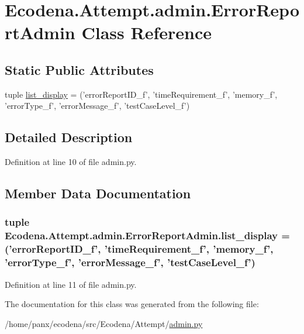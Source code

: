 \hypertarget{class_ecodena_1_1_attempt_1_1admin_1_1_error_report_admin}{
\section{Ecodena.Attempt.admin.ErrorReportAdmin Class Reference}
\label{d6/dbe/class_ecodena_1_1_attempt_1_1admin_1_1_error_report_admin}
}
\subsection*{Static Public Attributes}
\begin{DoxyCompactItemize}
\item 
tuple \hyperlink{class_ecodena_1_1_attempt_1_1admin_1_1_error_report_admin_a36d000c316cf4d6c0373922e9bda557d}{list\_\-display} = ('errorReportID\_\-f', 'timeRequirement\_\-f', 'memory\_\-f', 'errorType\_\-f', 'errorMessage\_\-f', 'testCaseLevel\_\-f')
\end{DoxyCompactItemize}


\subsection{Detailed Description}


Definition at line 10 of file admin.py.



\subsection{Member Data Documentation}
\hypertarget{class_ecodena_1_1_attempt_1_1admin_1_1_error_report_admin_a36d000c316cf4d6c0373922e9bda557d}{
\subsubsection[{list\_\-display}]{\setlength{\rightskip}{0pt plus 5cm}tuple {\bf Ecodena.Attempt.admin.ErrorReportAdmin.list\_\-display} = ('errorReportID\_\-f', 'timeRequirement\_\-f', 'memory\_\-f', 'errorType\_\-f', 'errorMessage\_\-f', 'testCaseLevel\_\-f')}}
\label{d6/dbe/class_ecodena_1_1_attempt_1_1admin_1_1_error_report_admin_a36d000c316cf4d6c0373922e9bda557d}


Definition at line 11 of file admin.py.



The documentation for this class was generated from the following file:\begin{DoxyCompactItemize}
\item 
/home/panx/ecodena/src/Ecodena/Attempt/\hyperlink{_attempt_2admin_8py}{admin.py}\end{DoxyCompactItemize}
